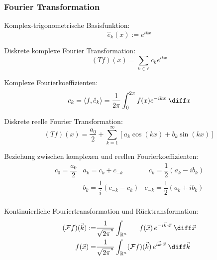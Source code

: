 \documentclass[11pt]{article}
\numberwithin{equation}{section}
\begin{document}
      \subsubsection{Fourier Transformation}
        Komplex-trigonometrische Basisfunktion:
        \begin{equation}
          \hat{e}_k(x):=e^{ikx}
        \end{equation}

        Diskrete komplexe Fourier Transformation:
        \begin{equation}
          (Tf)(x)=\sum_{k\in\mathbb{Z}}c_k e^{ikx}
        \end{equation}

        Komplexe Fourierkoeffizienten:
        \begin{equation}
          c_k = \left<f,\hat{e}_k\right>=\frac{1}{2\pi}\int_0^{2\pi}f(x)e^{-ikx}\;\diff x
        \end{equation}

        Diskrete reelle Fourier Transformation:
        \begin{equation}
          (Tf)(x)=\frac{a_0}{2}+\sum_{k=1}^{\infty}\left[a_k \cos(kx) + b_k \sin(kx) \right]
        \end{equation}

        Beziehung zwischen komplexen und reellen Fourierkoeffizienten:
        \begin{equation}
          \begin{array}{clc}
            c_0 = \dfrac{a_0}{2} & a_k = c_k+c_{-k} & \phantom{_{-}}c_k = \dfrac{1}{2}\left(a_k-ib_k\right) \\ [6pt]
            & b_k = \dfrac{1}{i}\left(c_{-k}-c_{k}\right) & c_{-k} = \dfrac{1}{2}\left(a_k+ib_k\right) \\
          \end{array}
        \end{equation}

        Kontinuierliche Fouriertransformation und Rücktransformation:
        \begin{equation}
          \begin{aligned}
            (\mathcal{F}f)(\vec{k}) :=& \frac{1}{\sqrt{2\pi}^n}\int_{\mathbb{R}^n} \phantom{(\mathcal{F})}f(\vec{x})\, e^{-i\vec{k}\cdot\vec{x}}\;\diff\vec{x} \\
            \phantom{(\mathcal{F})}f(\vec{x}) =& \frac{1}{\sqrt{2\pi}^n}\int_{\mathbb{R}^n} (\mathcal{F}f)(\vec{k}) \,e^{i\vec{k}\cdot\vec{x}}\;\diff \vec{k} \\
          \end{aligned}
        \end{equation}
\end{document}
